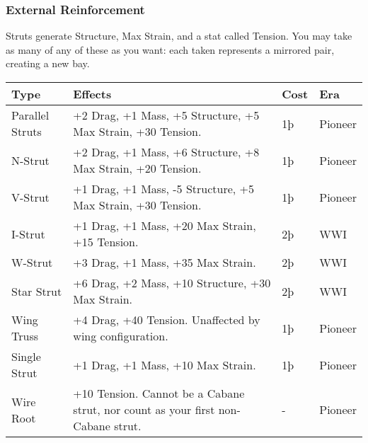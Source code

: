 \documentclass{article}
\begin{document}
\subsubsection{External Reinforcement}
\label{_External_Reinforcement}

Struts generate Structure, Max Strain, and a stat called Tension. You
may take as many of any of these as you want: each taken represents a
mirrored pair, creating a new bay.

\begin{tabular}{|l|l|l|l|}
  \hline
  Type                    & Effects                                                     & Cost    & Era     \\\hline
  Parallel Struts         & +2 Drag, +1 Mass, +5 Structure, +5 Max Strain, +30
  Tension.                & 1þ                                                          & Pioneer           \\\hline
  N-Strut                 & +2 Drag, +1 Mass, +6 Structure, +8 Max Strain, +20 Tension. &
  1þ                      & Pioneer                                                                         \\\hline
  V-Strut                 & +1 Drag, +1 Mass, -5 Structure, +5 Max Strain, +30 Tension. &
  1þ                      & Pioneer                                                                         \\\hline
  I-Strut                 & +1 Drag, +1 Mass, +20 Max Strain, +15 Tension.              & 2þ      & WWI     \\\hline
  W-Strut                 & +3 Drag, +1 Mass, +35 Max Strain.                           & 2þ      & WWI     \\\hline
  Star Strut              & +6 Drag, +2 Mass, +10 Structure, +30 Max Strain.            & 2þ      &
  WWI                                                                                                       \\\hline
  Wing Truss              & +4 Drag, +40 Tension. Unaffected by wing configuration.     &
  1þ                      & Pioneer                                                                         \\\hline
  Single Strut            & +1 Drag, +1 Mass, +10 Max Strain.                           & 1þ      & Pioneer \\\hline
  Wire Root               & +10 Tension. Cannot be a Cabane strut, nor count as your
  first non-Cabane strut. & -                                                           & Pioneer           \\\hline
\end{tabular}
\end{document}
